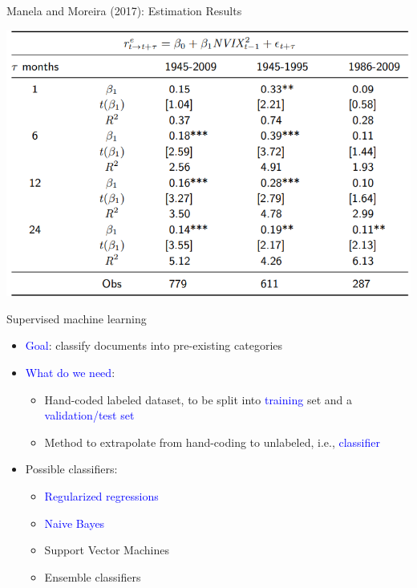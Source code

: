 \documentclass[english]{beamer}
\begin{document}
\begin{frame}{\small{Manela and Moreira (2017): Estimation Results}}
\vspace{-7pt}
\begin{center}
\includegraphics[scale=0.5]{Images/mm2017-3.png}
\end{center}
\end{frame}

\begin{frame}{Supervised machine learning}
\begin{itemize}
\setlength{\itemsep}{1.2em}
\setlength{\itemindent}{-0.8em}
\item \textcolor{blue}{Goal}: classify documents into pre-existing categories

\item \textcolor{blue}{What do we need}: 
\vspace{4pt}
\begin{itemize}
\setlength{\itemindent}{-1.5em}
\setlength{\itemsep}{0.5em}
\item Hand-coded labeled dataset, to be split into \textcolor{blue}{training} set and a\\
\hspace{-14pt}\textcolor{blue}{validation/test set}
\item Method to extrapolate from hand-coding to unlabeled, i.e., \textcolor{blue}{classifier}
\end{itemize}

\item Possible classifiers:
\vspace{4pt}
\begin{itemize}
\setlength{\itemindent}{-1.5em}
\setlength{\itemsep}{0.5em}
\item \textcolor{blue}{Regularized regressions}
\item \textcolor{blue}{Naive Bayes}
\item Support Vector Machines
\item Ensemble classifiers
\end{itemize}
 
\end{itemize}
\end{frame}
\end{document}
